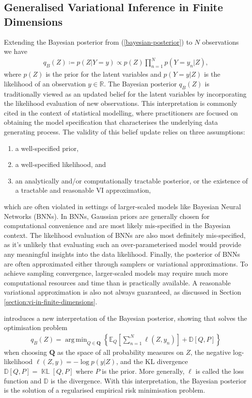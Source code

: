 \documentclass{article}
\newcommand{\KLD}{\operatorname{\mathbb{KL}}}
\DeclareMathOperator*{\argmin}{arg\,min}
\numberwithin{equation}{section}
\begin{document}
\subsection{Generalised Variational Inference in Finite Dimensions}
Extending the Bayesian posterior from (\ref{bayesian-posterior}) to $N$ observations we have
\begin{align}
    \label{bayesian-posterior-gvi}
    q_B(Z) \coloneqq p(Z\vert Y=y) \propto p(Z) \prod_{n=1}^N p(Y=y_n \vert Z),
\end{align}
where $p(Z)$ is the prior for the latent variables and $p(Y=y \vert Z)$ is the likelihood of an observation $y \in \mathbb{R}$.
The Bayesian posterior $q_B(Z)$ is traditionally viewed as an updated belief for the latent variables by incorporating the likelihood evaluation of new observations.
This interpretation is commonly cited in the context of statistical modelling, where practitioners are focused on obtaining the model specification that characterises the underlying data generating process. 
The validity of this belief update relies on three assumptions:
\begin{enumerate}
    \setlength\itemsep{-0.25em}
    \item a well-specified prior,
    \item a well-specified likelihood, and
    \item an analytically and/or computationally tractable posterior, or the existence of a tractable and reasonable VI approximation,
\end{enumerate}
which are often violated in settings of larger-scaled models like Bayesian Neural Networks (BNNs).
In BNNs, Gaussian priors are generally chosen for computational convenience and are most likely mis-specified in the Bayesian context.
The likelihood evaluation of BNNs are also most definitely mis-specified, as it's unlikely that evaluating such an over-parameterised model would provide any meaningful insights into the data likelihood.
Finally, the posterior of BNNs are often approximated either through samplers or variational approximations.
To achieve sampling convergence, larger-scaled models may require much more computational resources and time than is practically available.
A reasonable variational approximation is also not always guaranteed, as discussed in Section \ref{section:vi-in-finite-dimensions}.

\cite{knoblauch2022optimization} introduces a new interpretation of the Bayesian posterior, showing that solves the optimisation problem
\begin{align}
    q_B(Z) = \argmin_{Q \in \boldsymbol{Q}} \left\{\mathbb{E}_{Q}\left[\sum_{n=1}^N \ell \left(Z, y_n\right)\right] + \mathbb{D}\left[Q, P\right]\right\}
    \label{gvi-posterior}
\end{align}
when choosing $\boldsymbol{Q}$ as the space of all probability measures on $Z$, the negative log-likelihood $\ell(Z, y) =-\log p\left(y \vert Z\right)$,  and the KL divergence $\mathbb{D}\left[Q, P\right] = \KLD\left[Q, P\right]$ where $P$ is the prior.
More generally, $\ell$ is called the loss function and $\mathbb{D}$ is the divergence. With this interpretation, the Bayesian posterior is the solution of a regularised empirical risk minimisation problem.
\end{document}
